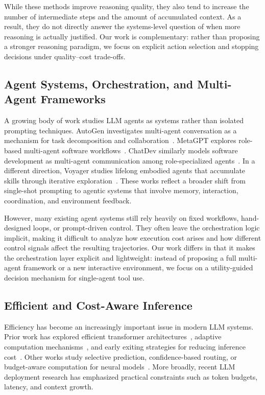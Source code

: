 While these methods improve reasoning quality, they also tend to increase the number of intermediate steps and the amount of accumulated context. As a result, they do not directly answer the systems-level question of when more reasoning is actually justified. Our work is complementary: rather than proposing a stronger reasoning paradigm, we focus on explicit action selection and stopping decisions under quality--cost trade-offs.

\subsection{Agent Systems, Orchestration, and Multi-Agent Frameworks}

A growing body of work studies LLM agents as systems rather than isolated prompting techniques. AutoGen investigates multi-agent conversation as a mechanism for task decomposition and collaboration~\cite{wu2023autogen}. MetaGPT explores role-based multi-agent software workflows~\cite{hong2024metagpt}. ChatDev similarly models software development as multi-agent communication among role-specialized agents~\cite{qian2024chatdev}. In a different direction, Voyager studies lifelong embodied agents that accumulate skills through iterative exploration~\cite{wang2023voyager}. These works reflect a broader shift from single-shot prompting to agentic systems that involve memory, interaction, coordination, and environment feedback.

However, many existing agent systems still rely heavily on fixed workflows, hand-designed loops, or prompt-driven control. They often leave the orchestration logic implicit, making it difficult to analyze how execution cost arises and how different control signals affect the resulting trajectories. Our work differs in that it makes the orchestration layer explicit and lightweight: instead of proposing a full multi-agent framework or a new interactive environment, we focus on a utility-guided decision mechanism for single-agent tool use.

\subsection{Efficient and Cost-Aware Inference}

Efficiency has become an increasingly important issue in modern LLM systems. Prior work has explored efficient transformer architectures~\cite{tay2022efficient}, adaptive computation mechanisms~\cite{graves2016adaptive}, and early exiting strategies for reducing inference cost~\cite{elbayad2020depth}. Other works study selective prediction, confidence-based routing, or budget-aware computation for neural models~\cite{schuster2022confident,xin2020deebert}. More broadly, recent LLM deployment research has emphasized practical constraints such as token budgets, latency, and context growth.

